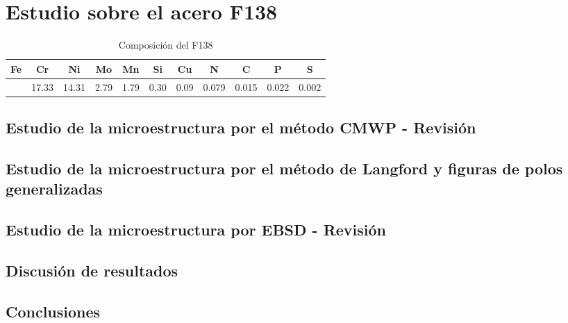 \chapter{Estudio sobre el acero F138}\label{C:F138}
\graphicspath{{./figs/04_F138/}}

\begin{table}[!htb]
\centering
\caption{Composición del F138}
\label{tab:F138Comp}
\begin{tabular}{|c|c|c|c|c|c|c|c|c|c|c|}
\hline
\rowcolor[HTML]{BBDAFF} 
\textbf{Fe} & \textbf{Cr} & \textbf{Ni} & \textbf{Mo} & \textbf{Mn} & \textbf{Si} & \textbf{Cu} & \textbf{N} & \textbf{C} & \textbf{P} & \textbf{S} \\ \hline
          &    17.33  &   14.31   &   2.79    &   1.79    &  0.30     &   0.09    &   0.079   &  0.015    &   0.022   &   0.002   \\ \hline
\end{tabular}
\end{table}
\section{Estudio de la microestructura por el método CMWP - Revisión}\label{S:F138CMWP}
\section{Estudio de la microestructura por el método de Langford y figuras de polos generalizadas}\label{S:F138LANG}
\section{Estudio de la microestructura por EBSD - Revisión}\label{S:F138EBSD}
\section{Discusión de resultados}\label{S:F138Dis}
\section{Conclusiones}\label{S:F138Conclusiones}
